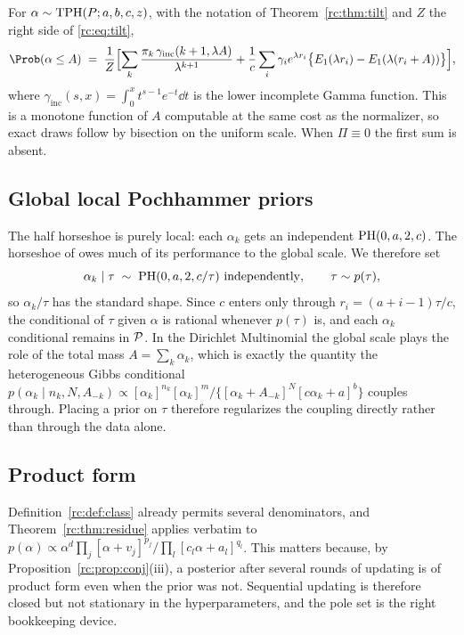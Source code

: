 \begin{corollary}\label{rc:cor:tiltcdf}
For $\alpha\sim\mathrm{TPH}(P;a,b,c,z)$, with the notation of Theorem~\ref{rc:thm:tilt} and $Z$ the right side of \eqref{rc:eq:tilt},
\[
\Prob(\alpha\le A)\;=\;\frac1Z\Bigl[\sum_k\frac{\pi_k\,\gamma_{\mathrm{inc}}(k+1,\lambda A)}{\lambda^{k+1}}+\frac1c\sum_i\gamma_ie^{\lambda r_i}\bigl\{E_1(\lambda r_i)-E_1(\lambda(r_i+A))\bigr\}\Bigr],
\]
where $\gamma_{\mathrm{inc}}(s,x)=\int_0^xt^{s-1}e^{-t}\dd t$ is the lower incomplete Gamma function. This is a monotone function of $A$ computable at the same cost as the normalizer, so exact draws follow by bisection on the uniform scale. When $\Pi\equiv0$ the first sum is absent.
\end{corollary}

\subsection{Global local Pochhammer priors}\label{rc:sec:globallocal}

The half horseshoe is purely local: each $\alpha_k$ gets an independent $\mathrm{PH}(0,a,2,c)$. The horseshoe of \citet{rc:carvalho2010} owes much of its performance to the global scale. We therefore set
\[
\alpha_k\mid\tau\;\sim\;\mathrm{PH}(0,a,2,c/\tau)\text{ independently},\qquad\tau\sim p(\tau),
\]
so $\alpha_k/\tau$ has the standard shape. Since $c$ enters only through $r_i=(a+i-1)\tau/c$, the conditional of $\tau$ given $\alpha$ is rational whenever $p(\tau)$ is, and each $\alpha_k$ conditional remains in $\mathcal{P}$. In the Dirichlet Multinomial the global scale plays the role of the total mass $A=\sum_k\alpha_k$, which is exactly the quantity the heterogeneous Gibbs conditional $p(\alpha_k\mid n_k,N,A_{-k})\propto[\alpha_k]^{n_k}[\alpha_k]^m/\{[\alpha_k+A_{-k}]^N[c\alpha_k+a]^b\}$ couples through. Placing a prior on $\tau$ therefore regularizes the coupling directly rather than through the data alone.

\subsection{Product form}

Definition~\ref{rc:def:class} already permits several denominators, and Theorem~\ref{rc:thm:residue} applies verbatim to $p(\alpha)\propto\alpha^d\prod_j[\alpha+v_j]^{p_j}/\prod_l[c_l\alpha+a_l]^{q_l}$. This matters because, by Proposition~\ref{rc:prop:conj}(iii), a posterior after several rounds of updating is of product form even when the prior was not. Sequential updating is therefore closed but not stationary in the hyperparameters, and the pole set is the right bookkeeping device.

